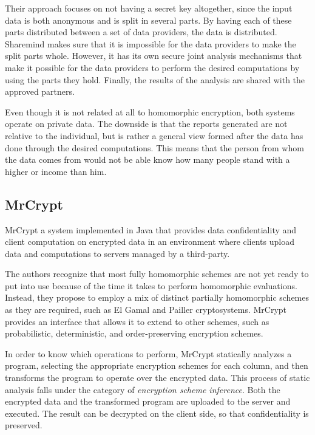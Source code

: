 Their approach focuses on not having a secret key altogether, since the input data is both anonymous and is split in several parts. By having each of these parts distributed between a set of data providers, the data is distributed. Sharemind makes sure that it is impossible for the data providers to make the split parts whole. However, it has its own secure joint analysis mechanisms that make it possible for the data providers to perform the desired computations by using the parts they hold. Finally, the results of the analysis are shared with the approved partners.

Even though it is not related at all to homomorphic encryption, both systems operate on private data. The downside is that the reports generated are not relative to the individual, but is rather a general view formed after the data has done through the desired computations. This means that the person from whom the data comes from would not be able know how many people stand with a higher or income than him.

\subsection{MrCrypt}
MrCrypt \cite{Tetali:2013:MSA:2544173.2509554} a system implemented in Java that provides data confidentiality and client computation on encrypted data in an environment where clients upload data and computations to servers managed by a third-party.

The authors recognize that most fully homomorphic schemes are not yet ready to put into use because of the time it takes to perform homomorphic evaluations. Instead, they propose to employ a mix of distinct partially homomorphic schemes as they are required, such as El Gamal \cite{ElGamal:1985:PKC:19478.19480} and Pailler \cite{Paillier:1999:PCB:1756123.1756146} cryptosystems. MrCrypt provides an interface that allows it to extend to other schemes, such as probabilistic, deterministic, and order-preserving encryption schemes. 

In order to know which operations to perform, MrCrypt statically analyzes a program, selecting the appropriate encryption schemes for each column, and then transforms the program to operate over the encrypted data. This process of static analysis falls under the category of \emph{encryption scheme inference}. Both the encrypted data and the transformed program are uploaded to the server and executed. The result can be decrypted on the client side, so that confidentiality is preserved.

